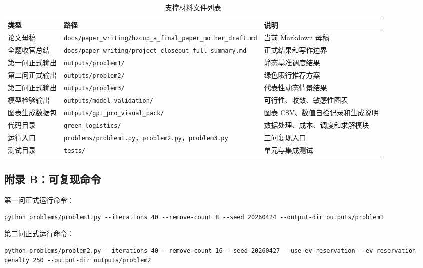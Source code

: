 \documentclass[UTF8,zihao=-4,a4paper]{ctexart}
\begin{document}
\begin{table}[H]
\centering
\small
\caption{支撑材料文件列表}
\label{tab:support-files}
\begin{tabularx}{\textwidth}{>{\raggedright\arraybackslash}X>{\raggedright\arraybackslash}X>{\raggedright\arraybackslash}X}
\toprule
类型 & 路径 & 说明 \\
\midrule
论文母稿 & \texttt{docs/paper\_writing/hzcup\_a\_final\_paper\_mother\_draft.md} & 当前 Markdown 母稿 \\
全题收官总结 & \texttt{docs/paper\_writing/project\_closeout\_full\_summary.md} & 正式结果和写作边界 \\
第一问正式输出 & \texttt{outputs/problem1/} & 静态基准调度结果 \\
第二问正式输出 & \texttt{outputs/problem2/} & 绿色限行推荐方案 \\
第三问正式输出 & \texttt{outputs/problem3/} & 代表性动态情景结果 \\
模型检验输出 & \texttt{outputs/model\_validation/} & 可行性、收敛、敏感性图表 \\
图表生成数据包 & \texttt{outputs/gpt\_pro\_visual\_pack/} & 图表 CSV、数值自检记录和生成说明 \\
代码目录 & \texttt{green\_logistics/} & 数据处理、成本、调度和求解模块 \\
运行入口 & \texttt{problems/problem1.py}，\texttt{problem2.py}，\texttt{problem3.py} & 三问复现入口 \\
测试目录 & \texttt{tests/} & 单元与集成测试 \\
\bottomrule
\end{tabularx}
\end{table}

\subsection{附录 B：可复现命令}

第一问正式运行命令：

\begin{lstlisting}[basicstyle=\ttfamily\small,breaklines=true]
python problems/problem1.py --iterations 40 --remove-count 8 --seed 20260424 --output-dir outputs/problem1
\end{lstlisting}

第二问正式运行命令：

\begin{lstlisting}[basicstyle=\ttfamily\small,breaklines=true]
python problems/problem2.py --iterations 40 --remove-count 16 --seed 20260427 --use-ev-reservation --ev-reservation-penalty 250 --output-dir outputs/problem2
\end{lstlisting}
\end{document}

